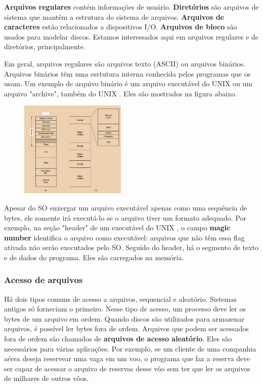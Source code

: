 \documentclass{article}
\newcommand\unix{{\color{red}UNIX} }
\begin{document}
\textbf{Arquivos regulares} contém informações de usuário. \textbf{Diretórios} são arquivos de sistema que mantêm a estrutura do sistema de arquivos. \textbf{Arquivos de caracteres} estão relacionados a dispositivos I/O. \textbf{Arquivos de bloco} são usados para modelar discos. Estamos interessados aqui em arquivos regulares e de diretórios, principalmente.

Em geral, arquivos regulares são arquivos texto (ASCII) ou arquivos binários. Arquivos binários têm uma esrtutura interna conhecida pelos programas que os usam. 
Um exemplo de arquivo binário é um arquivo executável do \unix ou um arquivo "archive", também do \unix. Eles são mostrados na figura abaixo.

\begin{figure}[h]
  \begin{center}
    \includegraphics[width=0.45\textwidth]{img/5-3.png}
  \end{center}
  \caption{}
  \label{fig:}
\end{figure}

Apesar do SO enxergar um arquivo executável apenas como uma sequência de bytes, ele somente irá executá-lo se o arquivo tiver um formato adequado. Por exemplo, na seção "header" de um executável do \unix, o campo \textbf{magic number} identifica o arquivo como executável: arquivos que não têm essa flag ativada não serão executados pelo SO. Seguido do header, há o segmento de texto e de dados do programa. Eles são carregados na memória.

\subsubsection{Acesso de arquivos}

Há dois tipos comuns de acesso a arquivos, sequencial e aleatório. Sistemas antigos só forneciam o primeiro. Nesse tipo de acesso, um processo deve ler os bytes de um arquivo em ordem. Quando discos são utilizados para armazenar arquivos, é possível ler bytes fora de ordem. Arquivos que podem ser acessados fora de ordem são chamados de \textbf{arquivos de acesso aleatório}. Eles são necessários para várias aplicações. Por exemplo, se um cliente de uma companhia aérea deseja reservear uma vaga em um voo, o programa que faz a reserva deve ser capaz de acessar o arquivo de reservas desse vôo sem ter que ler os arquivos de milhares de outros vôos. 
\end{document}
